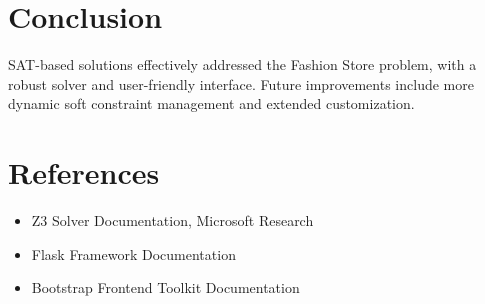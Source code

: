 \documentclass[unicode,11pt,a4paper,oneside,numbers=endperiod,openany]{scrartcl}
\begin{document}
\section{Conclusion}
SAT-based solutions effectively addressed the Fashion Store problem, with a robust solver and user-friendly interface. Future improvements include more dynamic soft constraint management and extended customization.

\section*{References}
\begin{itemize}
    \item Z3 Solver Documentation, Microsoft Research
    \item Flask Framework Documentation
    \item Bootstrap Frontend Toolkit Documentation
\end{itemize}
\end{document}
